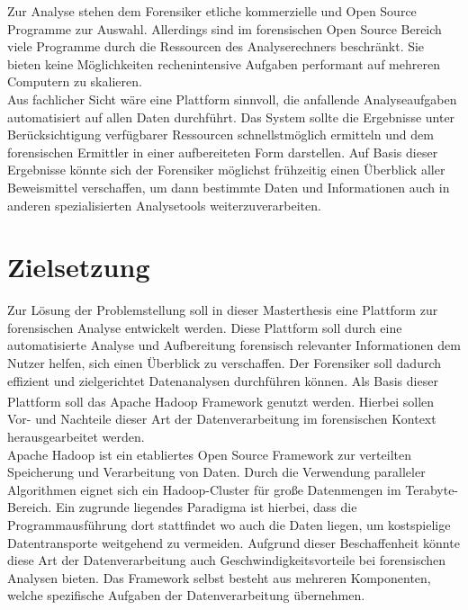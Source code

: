 \documentclass[11pt,a4paper]{report} %
\begin{document}
\noindent
Zur Analyse stehen dem Forensiker etliche kommerzielle und Open Source Programme zur Auswahl. Allerdings sind im forensischen Open Source Bereich viele Programme durch die Ressourcen des Analyserechners beschränkt. Sie bieten keine Möglichkeiten rechenintensive Aufgaben performant auf mehreren Computern zu skalieren.\\

\noindent
Aus fachlicher Sicht wäre eine Plattform sinnvoll, die anfallende Analyseaufgaben automatisiert auf allen Daten durchführt. Das System sollte die Ergebnisse unter Berücksichtigung verfügbarer Ressourcen schnellstmöglich ermitteln und dem forensischen Ermittler in einer aufbereiteten Form darstellen. Auf Basis dieser Ergebnisse könnte sich der Forensiker möglichst frühzeitig einen Überblick aller Beweismittel verschaffen, um dann bestimmte Daten und Informationen auch in anderen spezialisierten Analysetools weiterzuverarbeiten. 

\section{Zielsetzung}
Zur Lösung der Problemstellung soll in dieser Masterthesis eine Plattform zur forensischen Analyse entwickelt werden. Diese Plattform soll durch eine automatisierte Analyse und Aufbereitung forensisch relevanter Informationen dem Nutzer helfen, sich einen Überblick zu verschaffen. Der Forensiker soll dadurch effizient und zielgerichtet Datenanalysen durchführen können. Als Basis dieser Plattform soll das Apache Hadoop\textsuperscript{\textregistered} Framework genutzt werden. Hierbei sollen Vor- und Nachteile dieser Art der Datenverarbeitung im forensischen Kontext herausgearbeitet werden.\\ 

\noindent
Apache Hadoop ist ein etabliertes Open Source Framework zur verteilten Speicherung und Verarbeitung von Daten. Durch die Verwendung paralleler Algorithmen eignet sich ein Hadoop-Cluster für große Datenmengen im Terabyte-Bereich. Ein zugrunde liegendes Paradigma ist hierbei, dass die Programmausführung dort stattfindet wo auch die Daten liegen, um kostspielige Datentransporte weitgehend zu vermeiden. Aufgrund dieser Beschaffenheit könnte diese Art der Datenverarbeitung auch Geschwindigkeitsvorteile bei forensischen Analysen bieten. Das Framework selbst besteht aus mehreren Komponenten, welche spezifische Aufgaben der Datenverarbeitung übernehmen. \\
\end{document}
